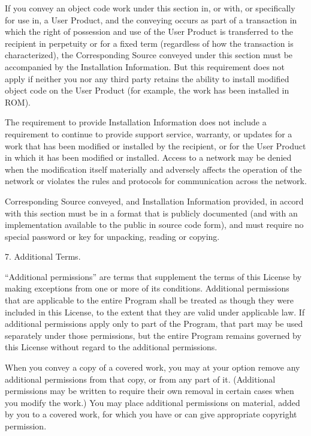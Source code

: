   If you convey an object code work under this section in, or with, or
specifically for use in, a User Product, and the conveying occurs as
part of a transaction in which the right of possession and use of the
User Product is transferred to the recipient in perpetuity or for a
fixed term (regardless of how the transaction is characterized), the
Corresponding Source conveyed under this section must be accompanied
by the Installation Information.  But this requirement does not apply
if neither you nor any third party retains the ability to install
modified object code on the User Product (for example, the work has
been installed in ROM).

  The requirement to provide Installation Information does not include a
requirement to continue to provide support service, warranty, or updates
for a work that has been modified or installed by the recipient, or for
the User Product in which it has been modified or installed.  Access to a
network may be denied when the modification itself materially and
adversely affects the operation of the network or violates the rules and
protocols for communication across the network.

  Corresponding Source conveyed, and Installation Information provided,
in accord with this section must be in a format that is publicly
documented (and with an implementation available to the public in
source code form), and must require no special password or key for
unpacking, reading or copying.

  7. Additional Terms.

  ``Additional permissions'' are terms that supplement the terms of this
License by making exceptions from one or more of its conditions.
Additional permissions that are applicable to the entire Program shall
be treated as though they were included in this License, to the extent
that they are valid under applicable law.  If additional permissions
apply only to part of the Program, that part may be used separately
under those permissions, but the entire Program remains governed by
this License without regard to the additional permissions.

  When you convey a copy of a covered work, you may at your option
remove any additional permissions from that copy, or from any part of
it.  (Additional permissions may be written to require their own
removal in certain cases when you modify the work.)  You may place
additional permissions on material, added by you to a covered work,
for which you have or can give appropriate copyright permission.

